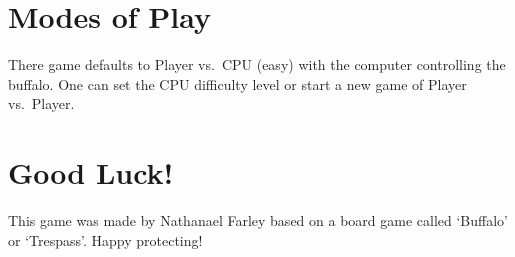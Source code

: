\documentclass[a4paper]{article}
\begin{document}
\section*{Modes of Play}
There game defaults to Player vs.\ CPU (easy) with the computer controlling the buffalo. One can set the CPU difficulty level or start a new game of Player vs.\ Player.

\section*{Good Luck!}
This game was made by Nathanael Farley based on a board game called `Buffalo' or `Trespass'. Happy protecting!
\end{document}
